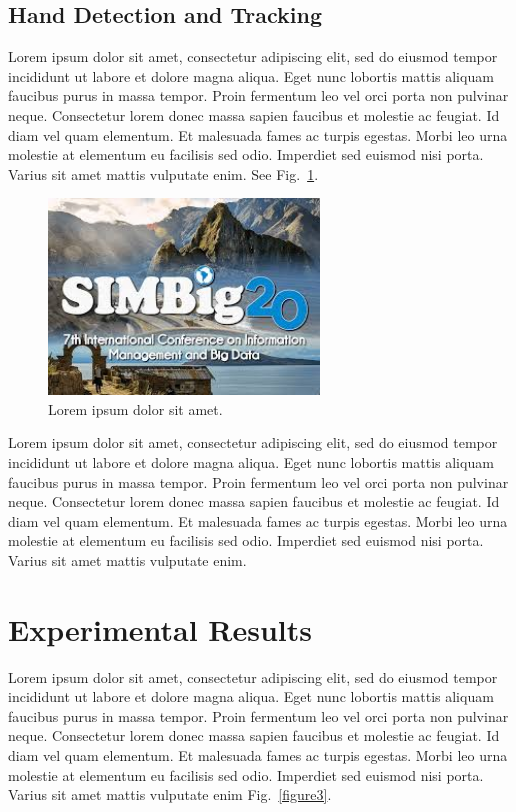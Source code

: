\documentclass[runningheads]{llncs}
\begin{document}
\subsection{Hand Detection and Tracking}

Lorem ipsum dolor sit amet, consectetur adipiscing elit, sed do eiusmod tempor incididunt ut labore et dolore magna aliqua. Eget nunc lobortis mattis aliquam faucibus purus in massa tempor. Proin fermentum leo vel orci porta non pulvinar neque. Consectetur lorem donec massa sapien faucibus et molestie ac feugiat. Id diam vel quam elementum. Et malesuada fames ac turpis egestas. Morbi leo urna molestie at elementum eu facilisis sed odio. Imperdiet sed euismod nisi porta. Varius sit amet mattis vulputate enim. See Fig.~\ref{figure2}.

\begin{figure}[!htbp]
\centerline{\includegraphics[width=72mm]{images/image-example.jpeg}}
\caption{Lorem ipsum dolor sit amet.} \label{figure2}
\end{figure}

Lorem ipsum dolor sit amet, consectetur adipiscing elit, sed do eiusmod tempor incididunt ut labore et dolore magna aliqua. Eget nunc lobortis mattis aliquam faucibus purus in massa tempor. Proin fermentum leo vel orci porta non pulvinar neque. Consectetur lorem donec massa sapien faucibus et molestie ac feugiat. Id diam vel quam elementum. Et malesuada fames ac turpis egestas. Morbi leo urna molestie at elementum eu facilisis sed odio. Imperdiet sed euismod nisi porta. Varius sit amet mattis vulputate enim.







\section{Experimental Results}

Lorem ipsum dolor sit amet, consectetur adipiscing elit, sed do eiusmod tempor incididunt ut labore et dolore magna aliqua. Eget nunc lobortis mattis aliquam faucibus purus in massa tempor. Proin fermentum leo vel orci porta non pulvinar neque. Consectetur lorem donec massa sapien faucibus et molestie ac feugiat. Id diam vel quam elementum. Et malesuada fames ac turpis egestas. Morbi leo urna molestie at elementum eu facilisis sed odio. Imperdiet sed euismod nisi porta. Varius sit amet mattis vulputate enim Fig.~\ref{figure3}.
\end{document}
